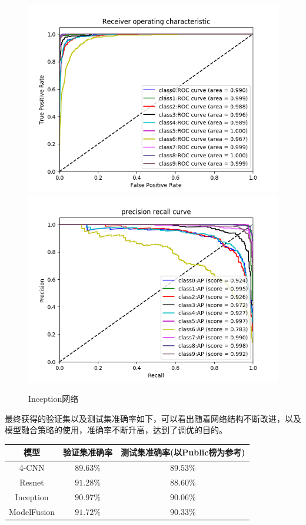 \documentclass[UTF8]{ctexart}
\begin{document}
\begin{figure}[H]
    \centering
    \includegraphics[scale=0.35]{../images/inceproc.png}
    \includegraphics[scale=0.35]{../images/inceppro.png}
    \caption{Inception网络}
\end{figure}

最终获得的验证集以及测试集准确率如下，可以看出随着网络结构不断改进，以及模型融合策略的使用，准确率不断升高，达到了调优的目的。

\begin{table}[H]
\centering
\begin{tabular}{ccc}
    \hline
    模型& 验证集准确率& 测试集准确率(以Public榜为参考)\\
    \hline
    4-CNN & $89.63\%$ &$89.53\%$\\
    Resnet & $91.28\%$&$88.60\%$\\
    Inception &$90.97\%$ & $90.06\%$\\
    ModelFusion &$91.72\%$&$90.33\%$\\
    \hline
\end{tabular}
\end{table}
\end{document}
